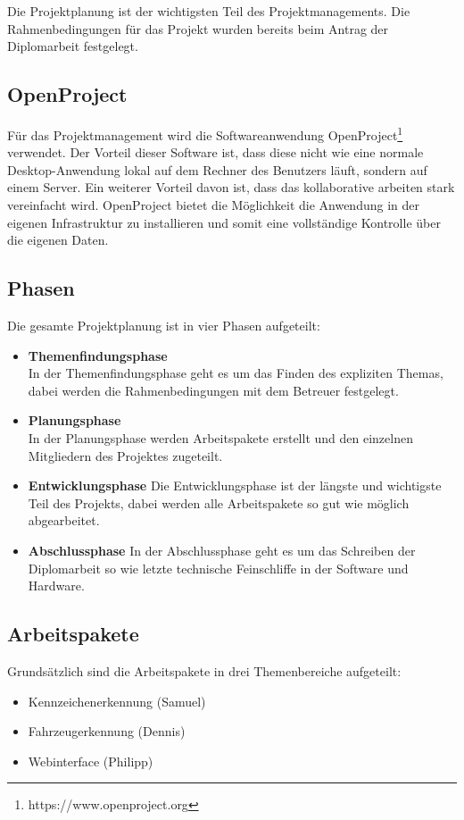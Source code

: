 Die Projektplanung ist der wichtigsten Teil des Projektmanagements. Die
Rahmenbedingungen für das Projekt wurden bereits beim Antrag der Diplomarbeit
festgelegt.

\subsection{OpenProject}
Für das Projektmanagement wird die Softwareanwendung
OpenProject\footnote{https://www.openproject.org} verwendet. Der Vorteil dieser
Software ist, dass diese nicht wie eine normale Desktop-Anwendung lokal auf dem
Rechner des Benutzers läuft, sondern auf einem Server. Ein weiterer Vorteil
davon ist, dass das kollaborative arbeiten stark vereinfacht wird. OpenProject
bietet die Möglichkeit die Anwendung in der eigenen Infrastruktur zu
installieren und somit eine vollständige Kontrolle über die eigenen Daten.

\subsection{Phasen}
Die gesamte Projektplanung ist in vier Phasen aufgeteilt:

\begin{itemize}
  \item \textbf{Themenfindungsphase}\\
  In der Themenfindungsphase geht es um das Finden des expliziten Themas, dabei
  werden die Rahmenbedingungen mit dem Betreuer festgelegt.
  \item \textbf{Planungsphase}\\
  In der Planungsphase werden Arbeitspakete erstellt und den einzelnen
  Mitgliedern des Projektes zugeteilt.
  \item \textbf{Entwicklungsphase}
  Die Entwicklungsphase ist der längste und wichtigste Teil des Projekts, dabei
  werden alle Arbeitspakete so gut wie möglich abgearbeitet.
  \item \textbf{Abschlussphase}
  In der Abschlussphase geht es um das Schreiben der Diplomarbeit so wie letzte
  technische Feinschliffe in der Software und Hardware.
\end{itemize}
\subsection{Arbeitspakete}
Grundsätzlich sind die Arbeitspakete in drei Themenbereiche aufgeteilt:

\begin{itemize}
  \item Kennzeichenerkennung (Samuel)
  \item Fahrzeugerkennung (Dennis)
  \item Webinterface (Philipp)
\end{itemize}


